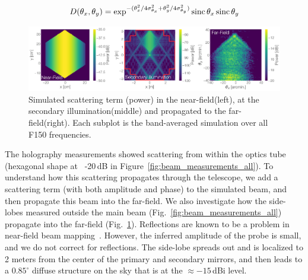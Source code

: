 \begin{equation}
    D(\theta_x,\theta_y) = \exp^{-(\theta_x^2/4\sigma_{\theta_x}^2 +\theta_y^2/4\sigma_{\theta_y}^2 )}\operatorname{sinc}{\theta_x}\operatorname{sinc}{\theta_y}
    \label{eq:model_conv}
\end{equation}


\begin{figure}[t]
    \centering
    \includegraphics[width = .95\textwidth]{Figures/scatter_model.pdf}
    \caption{Simulated scattering term (power) in the near-field(left), at the secondary illumination(middle) and propagated to the far-field(right).  Each subplot is the band-averaged simulation over all F150 frequencies.}
    \label{fig:scattering_forward}
\end{figure}

The holography measurements showed scattering from within the optics tube (hexagonal shape at ~-20\,dB in Figure~\ref{fig:beam_measurements_all}).  To understand how this scattering propagates through the telescope, we add a scattering term (with both amplitude and phase) to the simulated beam, and then propagate this beam into the far-field.  We also investigate how the side-lobes measured outside the main beam (Fig.~\ref{fig:beam_measurements_all}) propagate into the far-field (Fig.~\ref{fig:scattering_forward}).  Reflections are known to be a problem in near-field beam mapping~\cite{2020JLTP..199..156Y,7740846,387181}.  However, the inferred amplitude of the probe is small, and we do not correct for reflections.  The side-lobe spreads out and is localized to 2 meters from the center of the primary and secondary mirrors, and then leads to a $0.85^{\circ}$ diffuse structure on the sky that is at the $\approx -15$\,dBi level.
